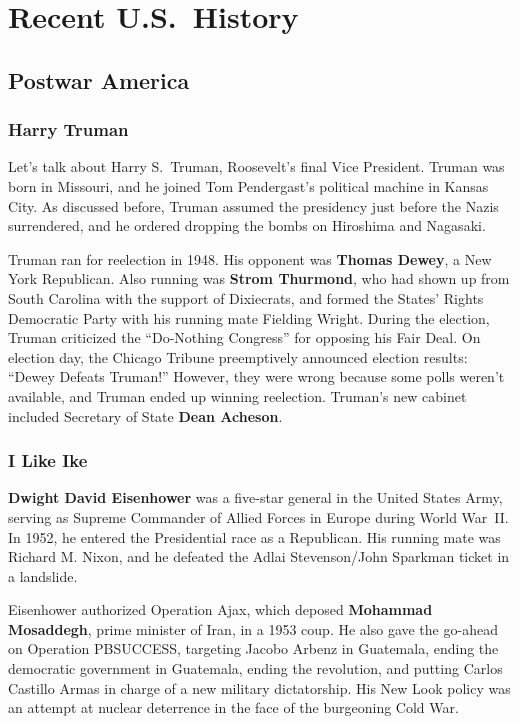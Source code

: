 \chapter{Recent U.S.\ History}

\section{Postwar America}

\subsection*{Harry Truman}

Let's talk about Harry S.\ Truman, Roosevelt's final Vice President.
Truman was born in Missouri, and he joined Tom Pendergast's political machine in Kansas City.
As discussed before, Truman assumed the presidency just before the Nazis surrendered,
and he ordered dropping the bombs on Hiroshima and Nagasaki.

Truman ran for reelection in 1948.
His opponent was \textbf{Thomas Dewey}, a New York Republican.
Also running was \textbf{Strom Thurmond}, who had shown up from South Carolina with the support of Dixiecrats,
and formed the States' Rights Democratic Party with his running mate Fielding Wright.
During the election, Truman criticized the ``Do-Nothing Congress'' for opposing his Fair Deal.
On election day, the Chicago Tribune preemptively announced election results: ``Dewey Defeats Truman!''
However, they were wrong because some polls weren't available, and Truman ended up winning reelection.
Truman's new cabinet included Secretary of State \textbf{Dean Acheson}.

\subsection*{I Like Ike}

\textbf{Dwight David Eisenhower} was a five-star general in the United States Army,
serving as Supreme Commander of Allied Forces in Europe during World War~II\@.
In 1952, he entered the Presidential race as a Republican.
His running mate was Richard M. Nixon, and he defeated the Adlai Stevenson/John Sparkman ticket in a landslide.

Eisenhower authorized Operation Ajax,
which deposed \textbf{Mohammad Mosaddegh}, prime minister of Iran, in a 1953 coup.
He also gave the go-ahead on Operation PBSUCCESS, targeting Jacobo Arbenz in Guatemala,
ending the democratic government in Guatemala, ending the revolution,
and putting Carlos Castillo Armas in charge of a new military dictatorship.
His New Look policy was an attempt at nuclear deterrence in the face of the burgeoning Cold War.

